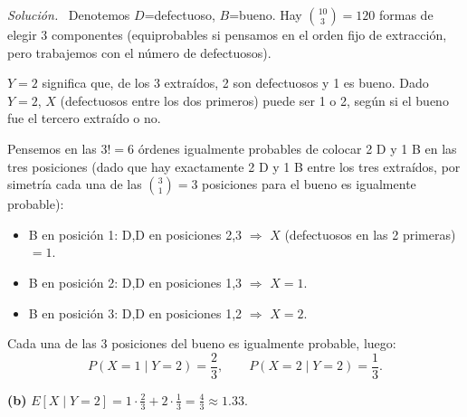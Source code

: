 \documentclass[11pt,a4paper]{article}
\newenvironment{solucion}{\par\noindent\textit{Solución.}~}{\par\vspace{1em}}
\begin{document}
\begin{solucion}
Denotemos $D$=defectuoso, $B$=bueno. Hay $\binom{10}{3}=120$ formas de elegir 3 componentes (equiprobables si pensamos en el orden fijo de extracción, pero trabajemos con el número de defectuosos).

$Y=2$ significa que, de los 3 extraídos, 2 son defectuosos y 1 es bueno. Dado $Y=2$, $X$ (defectuosos entre los dos primeros) puede ser 1 o 2, según si el bueno fue el tercero extraído o no.

Pensemos en las $3! = 6$ órdenes igualmente probables de colocar 2 D y 1 B en las tres posiciones (dado que hay exactamente 2 D y 1 B entre los tres extraídos, por simetría cada una de las $\binom{3}{1}=3$ posiciones para el bueno es igualmente probable):
\begin{itemize}
\item B en posición 1: D,D en posiciones 2,3 $\Rightarrow$ $X$ (defectuosos en las 2 primeras) $=1$.
\item B en posición 2: D,D en posiciones 1,3 $\Rightarrow$ $X=1$.
\item B en posición 3: D,D en posiciones 1,2 $\Rightarrow$ $X=2$.
\end{itemize}
Cada una de las 3 posiciones del bueno es igualmente probable, luego:
\[
P(X=1\mid Y=2) = \frac{2}{3}, \qquad P(X=2\mid Y=2) = \frac{1}{3}.
\]

\textbf{(b)} $E[X\mid Y=2] = 1\cdot\tfrac23 + 2\cdot\tfrac13 = \tfrac43 \approx 1.33$.
\end{solucion}
\end{document}
